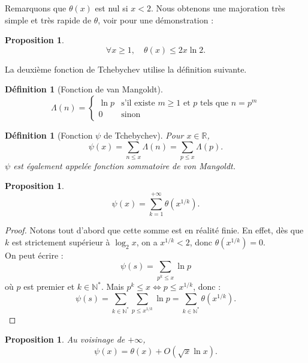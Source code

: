 \documentclass[french]{report}
\newtheorem{definition}[theorem]{Définition}
\newtheorem{proposition}[theorem]{Proposition}
\begin{document}
Remarquons que $\theta(x)$ est nul si $x<2$. Nous obtenons une majoration très simple et très rapide de $\theta$, voir \cite{hindry} pour une démonstration :

\begin{proposition}\label{prop:theta-majoration}
  \[
    \forall x\geq1,\quad \theta(x)\leq 2x\ln 2.
  \]
\end{proposition}

La deuxième fonction de Tchebychev utilise la définition suivante.

\begin{definition}[Fonction de van Mangoldt]
  \[
    \Lambda(n)=
    \begin{cases}
      \ln p & \text{s'il existe $m\geq1$ et $p$ tels que $n=p^m$} \\
      0 & \text{sinon}
    \end{cases}
  \]
\end{definition}

\begin{definition}[Fonction $\psi$ de Tchebychev] Pour $x\in \mathbb{R}$,
  \[
    \psi(x)
    = \sum_{n \le x}\Lambda (n)
    = \sum_{p \le x}\Lambda (p).
  \]
  $\psi$ est également appelée fonction sommatoire de von Mangoldt.
\end{definition}

\begin{proposition}
  \[
    \psi(x) = \sum_{k=1}^{+\infty}\theta(x^{1/k}).
  \]
\end{proposition}

\begin{proof}
  Notons tout d'abord que cette somme est en réalité finie. En effet, dès que $k$ est strictement supérieur à $\log_2 x$, on a $x^{1/k}<2$, donc $\theta(x^{1/k})=0$.
  \\

  On peut écrire :
  \[
    \psi(s) = \sum_{p^k\leq x}\ln p  
  \]
  où $p$ est premier et $k\in\mathbb{N}^*$. Mais $p^k\leq x\Leftrightarrow p\leq x^{1/k}$, donc :
  \[
    \psi(s)
    = \sum_{k\in\mathbb{N}^*}\sum_{p\leq x^{1/k}}\ln p 
    = \sum_{k\in\mathbb{N}^*}\theta(x^{1/k}).
  \]
\end{proof}

\begin{proposition}\label{prop:relation-psi-theta}
  Au voisinage de $+\infty$,
  \[
    \psi(x) = \theta(x) + O(\sqrt{x}\ln x).
  \]
\end{proposition}
\end{document}

